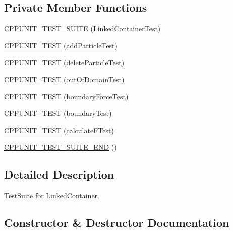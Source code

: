 \subsection*{Private Member Functions}
\begin{DoxyCompactItemize}
\item 
\hyperlink{classLinkedContainerTest_a00625077e5525884c6062662c9b01b5c}{C\+P\+P\+U\+N\+I\+T\+\_\+\+T\+E\+S\+T\+\_\+\+S\+U\+I\+TE} (\hyperlink{classLinkedContainerTest}{Linked\+Container\+Test})
\item 
\hyperlink{classLinkedContainerTest_abe995a0b3bd166156541fbaa1c2816d7}{C\+P\+P\+U\+N\+I\+T\+\_\+\+T\+E\+ST} (\hyperlink{classLinkedContainerTest_a1afa7e2cd6633b6fef51fd403116baef}{add\+Particle\+Test})
\item 
\hyperlink{classLinkedContainerTest_ab5611aeafd31118b2d3612cc3d978533}{C\+P\+P\+U\+N\+I\+T\+\_\+\+T\+E\+ST} (\hyperlink{classLinkedContainerTest_ab185ef32b0adc7be7b6de3baf007d8e2}{delete\+Particle\+Test})
\item 
\hyperlink{classLinkedContainerTest_a49d71f1e737194a59fb3882b5cc27ff4}{C\+P\+P\+U\+N\+I\+T\+\_\+\+T\+E\+ST} (\hyperlink{classLinkedContainerTest_a7ce227622a1298dadc7027f9f8e4b850}{out\+Of\+Domain\+Test})
\item 
\hyperlink{classLinkedContainerTest_aadca35c710fa6ce04410ebfa8f775b99}{C\+P\+P\+U\+N\+I\+T\+\_\+\+T\+E\+ST} (\hyperlink{classLinkedContainerTest_a8a3c4f33b08c4c63acb05cd5b47fe2b8}{boundary\+Force\+Test})
\item 
\hyperlink{classLinkedContainerTest_a4d719b9133e0396e8edbccd7dfd3d696}{C\+P\+P\+U\+N\+I\+T\+\_\+\+T\+E\+ST} (\hyperlink{classLinkedContainerTest_a3ea7a9a7335bc8d20c829bb7d0cd05ba}{boundary\+Test})
\item 
\hyperlink{classLinkedContainerTest_a2679aa59704d6af4eeafd77065f83563}{C\+P\+P\+U\+N\+I\+T\+\_\+\+T\+E\+ST} (\hyperlink{classLinkedContainerTest_adcf6642009e1818aad463c19f810b07c}{calculate\+F\+Test})
\item 
\hyperlink{classLinkedContainerTest_a73506489a7532733d8dba14efa8bc407}{C\+P\+P\+U\+N\+I\+T\+\_\+\+T\+E\+S\+T\+\_\+\+S\+U\+I\+T\+E\+\_\+\+E\+ND} ()
\end{DoxyCompactItemize}


\subsection{Detailed Description}
Test\+Suite for Linked\+Container. 

\subsection{Constructor \& Destructor Documentation}
